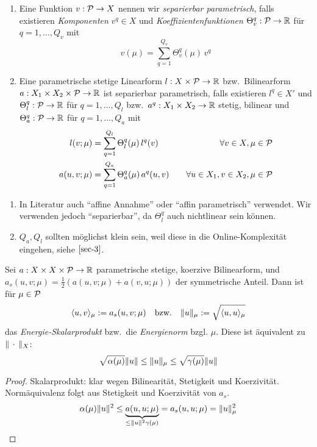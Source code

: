 \begin{defn} \beginwithlist
	\begin{enumerate}
		\item Eine Funktion $v : \mathcal{P} \to X$ nennen wir \emph{separierbar parametrisch}, falls existieren \emph{Komponenten} $v^q \in X$ und \emph{Koeffizientenfunktionen} $\Theta_v^q : \mathcal{P} \to \mathbb{R}$ für $q = 1,\dots,Q_v$ mit
			\[
				v(\mu) = \sum_{q=1}^{Q_v} \Theta_v^q(\mu) \, v^q
			\]
		\item Eine parametrische stetige Linearform $l : X \times \mathcal{P} \to \mathbb{R}$ bzw.\ Bilinearform $a : X_1 \times X_2 \times \mathcal{P} \to \mathbb{R}$ ist separierbar parametrisch, falls existieren $l^q \in X'$ und $\Theta_l^q : \mathcal{P} \to \mathbb{R}$ für $q = 1,\dots,Q_l$ bzw.\ $a^q : X_1 \times X_2 \to \mathbb{R}$ stetig, bilinear und $\Theta_a^q : \mathcal{P} \to \mathbb{R}$ für $q = 1,\dots,Q_a$ mit
			\begin{align*}
				l(v;\mu) &= \sum_{q=1}^{Q_l} \Theta_l^q(\mu) \, l^q(v) \quad &\forall v \in X, \mu \in \mathcal{P}\\
				a(u,v;\mu) &= \sum_{q=1}^{Q_a} \Theta_a^q(\mu) \, a^q(u,v) \quad &\forall u \in X_1, v \in X_2, \mu \in \mathcal{P}
			\end{align*}
	\end{enumerate}
\end{defn}

\begin{bem} \beginwithlistbem
	\begin{enumerate}
		\item In Literatur auch ``affine Annahme'' oder ``affin parametrisch'' verwendet.
			Wir verwenden jedoch ``separierbar'', da $\Theta_l^q$ auch nichtlinear sein können.
		\item $Q_a, Q_l$ sollten möglichst klein sein, weil diese in die Online-Komplexität eingehen, siehe $\cref{sec-3}$.
	\end{enumerate}
\end{bem}

\begin{satz}[Energienorm]
	Sei $a : X \times X \times \mathcal{P} \to \mathbb{R}$ parametrische stetige, koerzive Bilinearform, und $a_s(u,v;\mu) = \frac 1 2 (a(u,v;\mu)+a(v,u;\mu))$ der symmetrische Anteil.
	Dann ist für $\mu \in \mathcal{P}$
	\[
		\langle u, v \rangle_\mu := a_s(u,v;\mu) \quad \text{bzw.} \quad \|u\|_\mu := \sqrt{\langle u, u \rangle_\mu}
	\]
	das \emph{Energie-Skalarprodukt} bzw.\ die \emph{Energienorm} bzgl. $\mu$. Diese ist äquivalent zu $\|\,\cdot\,\|_X$:
	\[
		\sqrt{\alpha(\mu)} \|u\| \leq \|u\|_\mu \leq \sqrt{\gamma(\mu)} \|u\|
	\]

	\begin{proof}
		Skalarprodukt: klar wegen Bilinearität, Stetigkeit und Koerzivität.
		Normäquivalenz folgt aus Stetigkeit und Koerzivität von $a_s$.
		\[
			\alpha(\mu) \|u\|^2 \leq \underbrace{a(u,u;\mu)}_{\leq \|u\|^2 \gamma(\mu)} = a_s(u,u;\mu) = \|u\|_\mu^2
		\]
	\end{proof}
\end{satz}

